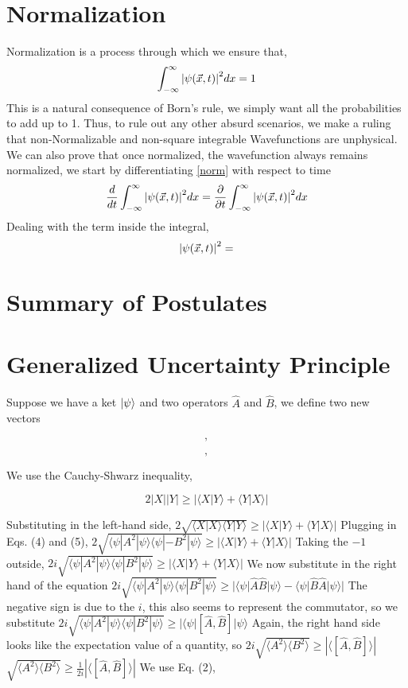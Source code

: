 \section{Normalization}
Normalization is a process through which we ensure that,
\begin{equation}\label{norm}
\int_{- \infty}^{\infty} \abs{\psi(\vec{x}, t)}^{2} dx = 1
\end{equation}
This is a natural consequence of Born's rule, we simply want all the probabilities to add up to 1. Thus, to rule out any other absurd scenarios, we make a ruling that non-Normalizable and non-square integrable Wavefunctions are unphysical.\\
We can also prove that once normalized, the wavefunction always remains normalized, we start by differentiating \ref{norm} with respect to time\\
$$\frac{d}{dt} \int_{- \infty}^{\infty} \abs{\psi(\vec{x}, t)}^{2} dx = \frac{\partial}{\partial t}\int_{- \infty}^{\infty} \abs{\psi(\vec{x}, t)}^{2} dx$$
Dealing with the term inside the integral,
$$ \abs{\psi(\vec{x}, t)}^{2} = $$
\section{Summary of Postulates}
\section{Generalized Uncertainty Principle}
Suppose we have a ket $\ket{\psi}$ and two operators $\hat{A}$ and $\hat{B}$, we define two new vectors

$$,$$

$$,$$

We use the Cauchy-Shwarz inequality,

$$ 2|X||Y| \geq |\langle X|Y \rangle + \langle Y|X \rangle |$$

Substituting in the left-hand side,
$2\sqrt{\langle X|X\rangle\langle Y|Y\rangle} \geq |\langle X| Y  \rangle+ \langle Y | X \rangle|$
Plugging in Eqs. (4) and (5),
$2\sqrt{\langle \psi |A^{2} |\psi \rangle \langle \psi | -B^{2}| \psi \rangle} \geq |\langle X | Y \rangle + \langle Y | X \rangle |$
Taking the $-1$ outside,
$2i\sqrt{\langle \psi |A^{2} |\psi \rangle \langle \psi | B^{2}| \psi \rangle} \geq |\langle X | Y \rangle + \langle Y | X \rangle|$
We now substitute in the right hand of the equation
$2i\sqrt{\langle \psi |A^{2} |\psi \rangle \langle \psi | B^{2}| \psi \rangle} \geq | \langle {\psi} |\hat{A}\hat{B}| {\psi} \rangle - \langle {\psi} |\hat{B}\hat{A}| {\psi} \rangle|$
The negative sign is due to the $i$, this also seems to represent the commutator, so we substitute
$2i\sqrt{\langle \psi |A^{2} |\psi \rangle \langle \psi | B^{2}| \psi \rangle }\geq |\langle\psi |[\hat{A},\hat{B}]|\psi\rangle$
Again, the right hand side looks like the expectation value of a quantity, so
$2i\sqrt{\langle A^{2} \rangle \langle B^{2} \rangle} \geq |\langle [\hat{A},\hat{B}] \rangle |$
$\sqrt{\langle A^{2} \rangle \langle B^{2} \rangle} \geq \frac{1}{2i} |\langle [\hat{A},\hat{B}] \rangle |$
We use Eq. (2),

